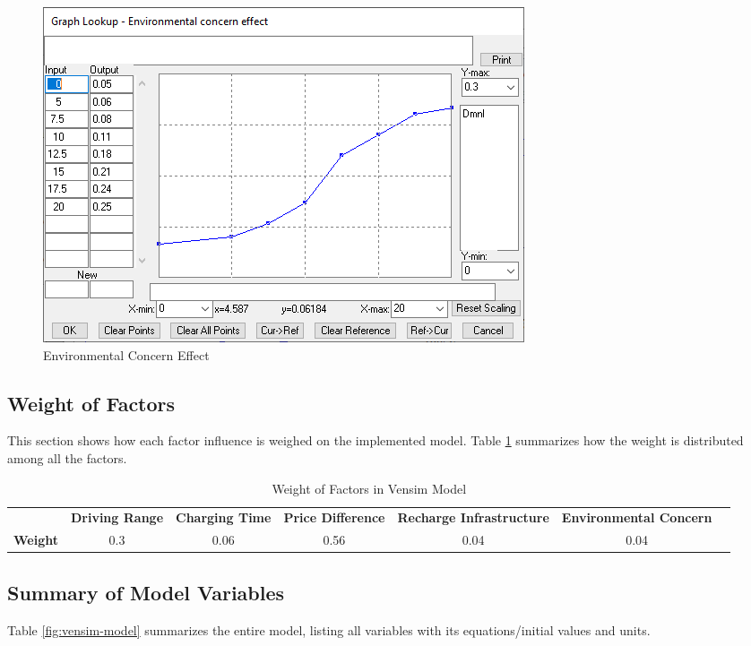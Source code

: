 \begin{figure}[htbp]
\centerline{\includegraphics[width=0.45\linewidth]{img/env-concern-effect.png}}
\caption{Environmental Concern Effect}
\label{fig:env-concern}
\end{figure}

\subsection{Weight of Factors}
This section shows how each factor influence is weighed on the implemented model. Table \ref{table:factors-weights} summarizes how the weight is distributed among all the factors.

\begin{table}[htbp]
\centering
\begin{adjustbox}{width=0.8\textwidth}
\begin{tabular}{ccccccc}
\cline{2-6}
\multicolumn{1}{l|}{} & \multicolumn{1}{l|}{\textbf{Driving Range}} & \multicolumn{1}{l|}{\textbf{Charging Time}} & \multicolumn{1}{l|}{\textbf{Price Difference}} & \multicolumn{1}{l|}{\textbf{Recharge Infrastructure}} & \multicolumn{1}{l|}{\textbf{Environmental Concern}} \\ \cline{1-6}
\multicolumn{1}{|l|}{\textbf{Weight}} & \multicolumn{1}{c|}{0.3} & \multicolumn{1}{c|}{0.06} & \multicolumn{1}{c|}{0.56} & \multicolumn{1}{c|}{0.04} & \multicolumn{1}{c|}{0.04} \\ \cline{1-6}
\end{tabular}
\end{adjustbox}
\caption{Weight of Factors in Vensim Model}
\label{table:factors-weights}
\end{table}

\subsection{Summary of Model Variables}
Table \ref{fig:vensim-model} summarizes the entire model, listing all variables with its equations/initial values and units.

